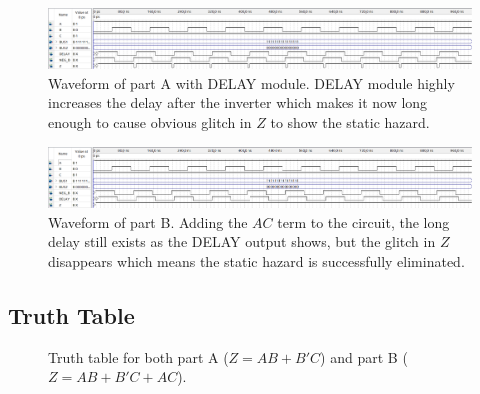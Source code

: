 \documentclass[12pt]{article}
\begin{document}
\begin{figure}[H]
    \centering
    \includegraphics[width=18cm]{lab1_partADelay_waveform.png}
    \caption{Waveform of part A with DELAY module. DELAY module highly increases the delay after the inverter which makes it now long enough to cause obvious glitch in $Z$ to show the static hazard.}
\end{figure}

\begin{figure}[H]
    \centering
    \includegraphics[width=18cm]{lab1_partB_waveform.png}
    \caption{Waveform of part B. Adding the $AC$ term to the circuit, the long delay still exists as the DELAY output shows, but the glitch in $Z$ disappears which means the static hazard is successfully eliminated.}
\end{figure}

\subsection{\textbf{Truth Table}}
\begin{figure}[H]
    \centering
    \begin{table}[H]
        \centering
    \end{table}
    \caption{Truth table for both part A ($Z=AB+B'C$) and part B ($Z=AB+B'C+AC$).}
\end{figure}
\end{document}
